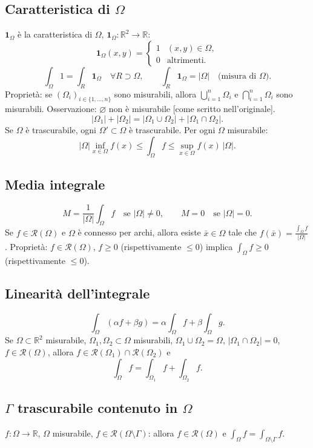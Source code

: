 \documentclass[11pt,a4paper]{article}
\newcommand{\R}{\mathbb R}\newcommand{\N}{\mathbb N}\newcommand{\pagina}[1]{\clearpage}
\begin{document}
\subsection*{Caratteristica di $\Omega$}
$\mathbf1_\Omega$ è la caratteristica di $\Omega$, $\mathbf1_\Omega:\R^2\to\R$:
\[\mathbf1_\Omega(x,y)=\begin{cases}1&(x,y)\in\Omega,\\0&\text{altrimenti}.\end{cases}\]
\[\int_\Omega1=\int_R\mathbf1_\Omega\quad\forall R\supset\Omega,\qquad\int_R\mathbf1_\Omega=|\Omega|\quad\text{(misura di }\Omega\text{)}.\]
\pagina{40}
Proprietà: se $(\Omega_i)_{i\in\{1,\ldots,n\}}$ sono misurabili, allora $\bigcup_{i=1}^n\Omega_i$ e $\bigcap_{i=1}^n\Omega_i$ sono misurabili. Osservazione: $\varnothing$ non è misurabile [come scritto nell'originale].
\[|\Omega_1|+|\Omega_2|=|\Omega_1\cup\Omega_2|+|\Omega_1\cap\Omega_2|.\]
Se $\Omega$ è trascurabile, ogni $\Omega'\subset\Omega$ è trascurabile. Per ogni $\Omega$ misurabile:
\[|\Omega|\inf_{x\in\Omega}f(x)\le\int_\Omega f\le\sup_{x\in\Omega}f(x)\,|\Omega|.\]
\subsection*{Media integrale}
\[M=\frac1{|\Omega|}\int_\Omega f\quad\text{se }|\Omega|\ne0,\qquad M=0\quad\text{se }|\Omega|=0.\]
Se $f\in\mathcal R(\Omega)$ e $\Omega$ è connesso per archi, allora esiste $\bar x\in\Omega$ tale che $f(\bar x)=\frac{\int_\Omega f}{|\Omega|}$.
Proprietà: $f\in\mathcal R(\Omega)$, $f\ge0$ (rispettivamente $\le0$) implica $\int_\Omega f\ge0$ (rispettivamente $\le0$).
\subsection*{Linearità dell'integrale}
\[\int_\Omega(\alpha f+\beta g)=\alpha\int_\Omega f+\beta\int_\Omega g.\]
Se $\Omega\subset\R^2$ misurabile, $\Omega_1,\Omega_2\subset\Omega$ misurabili, $\Omega_1\cup\Omega_2=\Omega$, $|\Omega_1\cap\Omega_2|=0$, $f\in\mathcal R(\Omega)$, allora $f\in\mathcal R(\Omega_1)\cap\mathcal R(\Omega_2)$ e
\[\int_\Omega f=\int_{\Omega_1}f+\int_{\Omega_2}f.\]
\pagina{41}
\subsection*{$\Gamma$ trascurabile contenuto in $\Omega$}
$f:\Omega\to\R$, $\Omega$ misurabile, $f\in\mathcal R(\Omega\setminus\Gamma)$: allora $f\in\mathcal R(\Omega)$ e $\int_\Omega f=\int_{\Omega\setminus\Gamma}f$.
\end{document}
